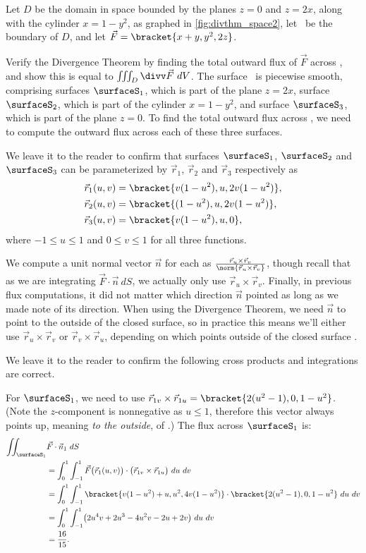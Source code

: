 \begin{example}\label{ex_divthm_space2}
Let $D$ be the domain in space bounded by the planes $z=0$ and $z=2x$, along with the cylinder $x=1-y^2$, as graphed in \autoref{fig:divthm_space2}, let \surfaceS\ be the boundary of $D$, and let $\vec F =\bracket{x+y,y^2, 2z}$. 

Verify the Divergence Theorem by finding the total outward flux of $\vec F$ across \surfaceS, and show this is equal to $\iiint_D \divv\vec F\ dV$.
\solution
The surface \surfaceS\ is piecewise smooth, comprising surfaces $\surfaceS_1$, which is part of the plane $z=2x$, surface $\surfaceS_2$, which is part of the cylinder $x=1-y^2$, and surface $\surfaceS_3$, which is part of the plane $z=0$. To find the total outward flux across \surfaceS, we need to compute the outward flux across each of these three surfaces.

We leave it to the reader to confirm that surfaces $\surfaceS_1$, $\surfaceS_2$ and $\surfaceS_3$ can be parameterized by $\vec r_1$, $\vec r_2$ and $\vec r_3$ respectively as
\begin{align*}
\vec r_1(u,v) &=\bracket{v(1-u^2), u, 2v(1-u^2)}, \\
\vec r_2(u,v) &=\bracket{(1-u^2), u, 2v(1-u^2)},\\
\vec r_3(u,v) &=\bracket{v(1-u^2), u, 0},
\end{align*}
where $-1\leq u\leq 1$ and $0\leq v\leq 1$ for all three functions.

We compute a unit normal vector $\vec n$ for each as $\frac{\vec r_u\times\vec r_v}{\norm{\vec r_u\times\vec r_v}}$, though recall that as we are integrating $\vec F\cdot \vec n\ dS$, we actually only use $\vec r_u\times\vec r_v$. Finally, in previous flux computations, it did not matter which direction $\vec n$ pointed as long as we made note of its direction. When using the Divergence Theorem, we need $\vec n$ to point to the outside of the closed surface, so in practice this means we'll either use $\vec r_u\times\vec r_v$ or $\vec r_v\times\vec r_u$, depending on which points outside of the closed surface \surfaceS.

We leave it to the reader to confirm the following cross products and integrations are correct.

For $\surfaceS_1$, we need to use $\vec r_{1v}\times\vec r_{1u} =\bracket{2(u^2-1),0,1-u^2}$. (Note the $z$-component is nonnegative as $u\leq 1$, therefore this vector always points up, meaning \emph{to the outside}, of \surfaceS.) The flux across $\surfaceS_1$ is:
\begin{align*}
	\iint_{\surfaceS_1} &\vec F\cdot \vec n_1\ dS
	 \\
	&= \int_0^1\int_{-1}^1 \vec F\bigl(\vec r_1(u,v)\bigr)\cdot \bigl(\vec r_{1v}\times\vec r_{1u}\bigr)\ du\ dv\\
	&= \int_0^1\int_{-1}^1\bracket{v(1-u^2)+u, u^2,4v(1-u^2)}\cdot\bracket{2(u^2-1),0,1-u^2}\ du\ dv\\
	&= \int_0^1\int_{-1}^1 \bigl(2u^4v+2u^3-4u^2v-2u+2v\bigr)\ du\ dv\\
	&= \frac{16}{15}.
\end{align*}


\end{example}
